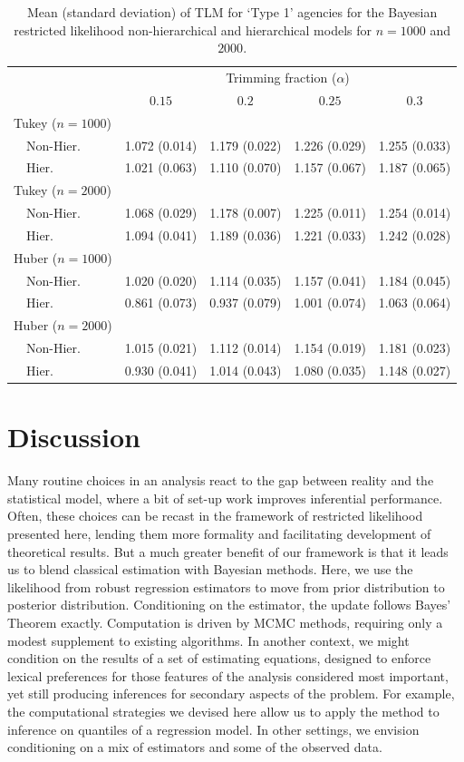 \documentclass[12pt]{article}
\begin{document}
\begin{table}[!tbp]
{\small
\begin{center}
\begin{tabular}{lllll}
\hline\hline
& \multicolumn{4}{c}{Trimming fraction ($\alpha$)}\\
\multicolumn{1}{l}{}&\multicolumn{1}{c}{$0.15$}&\multicolumn{1}{c}{$0.2$}&\multicolumn{1}{c}{$0.25$}&\multicolumn{1}{c}{$0.3$}\tabularnewline
\hline
{\mdseries Tukey ($n=1000$)}&&&&\tabularnewline
~~Non-Hier.&1.072 (0.014)&1.179 (0.022)&1.226 (0.029)&1.255 (0.033)\tabularnewline
~~Hier.&1.021 (0.063)&1.110 (0.070)&1.157 (0.067)&1.187 (0.065)\tabularnewline
\hline
{\mdseries Tukey ($n=2000$) }&&&&\tabularnewline
~~Non-Hier.&1.068 (0.029)&1.178 (0.007)&1.225 (0.011)&1.254 (0.014)\tabularnewline
~~Hier.&1.094 (0.041)&1.189 (0.036)&1.221 (0.033)&1.242 (0.028)\tabularnewline
\hline
{\mdseries Huber  ($n=1000$)}&&&&\tabularnewline
~~Non-Hier.&1.020 (0.020)&1.114 (0.035)&1.157 (0.041)&1.184 (0.045)\tabularnewline
~~Hier.&0.861 (0.073)&0.937 (0.079)&1.001 (0.074)&1.063 (0.064)\tabularnewline
\hline
{\mdseries Huber ($n=2000$)}&&&&\tabularnewline
~~Non-Hier.&1.015 (0.021)&1.112 (0.014)&1.154 (0.019)&1.181 (0.023)\tabularnewline
~~Hier.&0.930 (0.041)&1.014 (0.043)&1.080 (0.035)&1.148 (0.027)\tabularnewline
\hline
\end{tabular}
\end{center}
\caption{Mean (standard deviation) of TLM for `Type 1' agencies for the Bayesian restricted likelihood non-hierarchical and hierarchical models for $n=1000$ and $2000$.} \label{tab:tlmTable}
}
\end{table}


\section{Discussion}
\label{Conclusions}

Many routine choices in an analysis react to the gap between reality and the
statistical model, where a bit of set-up work improves inferential
performance.  Often, these choices can be recast in the framework of
restricted likelihood presented here, lending them more formality and facilitating
development of theoretical results.  But a much greater benefit of our
framework is that it leads us to blend classical estimation with
Bayesian methods.  Here, we use the likelihood from robust regression
estimators to move from prior distribution to posterior distribution.
Conditioning on the estimator, the update follows Bayes' Theorem
exactly.   Computation is driven by MCMC methods, requiring only a modest supplement to existing algorithms.  In another context, we might condition on the results of a set of estimating equations, designed to enforce lexical preferences for those features of the analysis considered most important, yet still producing inferences for secondary aspects of the problem. For example, the computational strategies we devised here allow us to apply the method to inference on quantiles of a regression model. In other settings, we envision conditioning on a mix of estimators and some of the observed data.  
\end{document}
